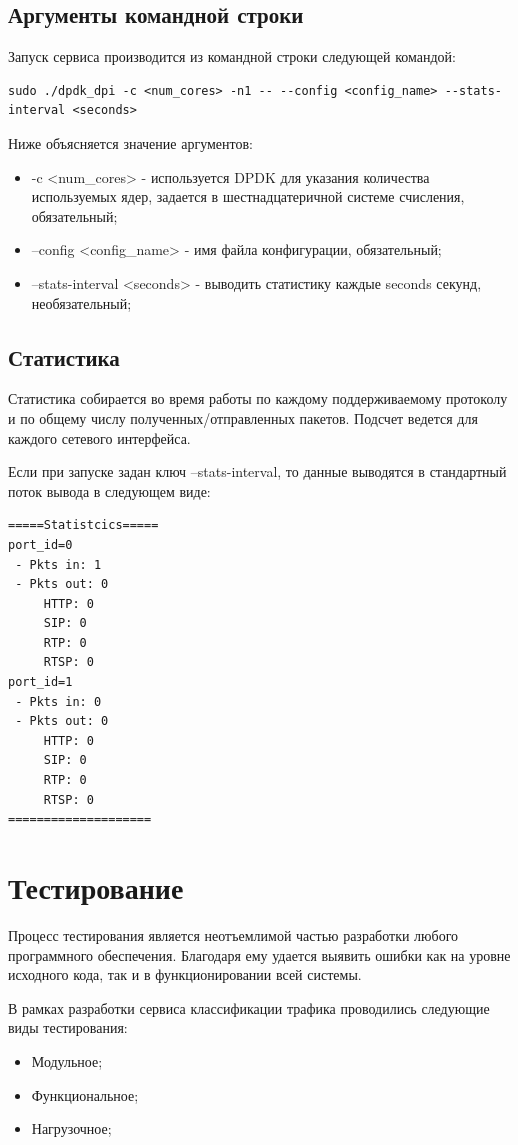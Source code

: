 \subsection{Аргументы командной строки}
Запуск сервиса производится из командной строки следующей командой:
\begin{lstlisting}
sudo ./dpdk_dpi -c <num_cores> -n1 -- --config <config_name> --stats-interval <seconds>
\end{lstlisting}
Ниже объясняется значение аргументов:
\begin{itemize}
\item -c <num\_cores> - используется DPDK для указания количества используемых ядер, задается в шестнадцатеричной системе счисления, обязательный;
\item --config <config\_name> - имя файла конфигурации, обязательный;
\item --stats-interval <seconds> - выводить статистику каждые seconds секунд, необязательный;
\end{itemize}

\subsection{Статистика}
Статистика собирается во время работы по каждому поддерживаемому протоколу и по общему числу полученных/отправленных пакетов. Подсчет ведется для каждого сетевого интерфейса.

Если при запуске задан ключ --stats-interval, то данные выводятся в стандартный поток вывода в следующем виде:
\begin{lstlisting}
=====Statistcics=====
port_id=0
 - Pkts in: 1
 - Pkts out: 0
     HTTP: 0
     SIP: 0
     RTP: 0
     RTSP: 0
port_id=1
 - Pkts in: 0
 - Pkts out: 0
     HTTP: 0
     SIP: 0
     RTP: 0
     RTSP: 0
====================
\end{lstlisting}


\section{Тестирование}
Процесс тестирования является неотъемлимой частью разработки любого программного обеспечения. Благодаря ему удается выявить ошибки как на уровне исходного кода, так и в функционировании всей системы.

В рамках разработки сервиса классификации трафика проводились следующие виды тестирования:
\begin{itemize}
\item Модульное;
\item Функциональное;
\item Нагрузочное;
\end{itemize}


